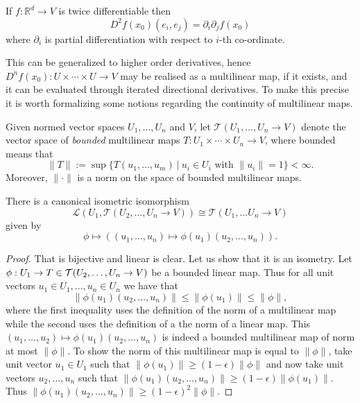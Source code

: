 \documentclass[twoside, a4paper, 10pt]{amsart}
\begin{document}
\begin{lemma}\label{lemma: second derivative is iterated derivative} If $f: \mathbb{R}^d \to V$ is twice differentiable then $$ D^2 f (x_0) (e_i, e_j) = \partial_i \partial_j f(x_0)$$ where $\partial_i$ is partial differentiation with respect to $i$-th co-ordinate. \end{lemma}

This can be generalized to higher order derivatives, hence $D^n f(x_0) : U \times \cdots \times U \to V$ may be realised as a multilinear map, if it exists, and it can be evaluated through iterated directional derivatives. To make this precise it is worth formalizing some notions regarding the continuity of multilinear maps.

\begin{mydef} Given normed vector spaces $U_1, \ldots, U_n$ and $V$, let $\mathcal{T}(U_1, \ldots, U_n \to V)$ denote the vector space of \textit{bounded} multilinear maps $T: U_1 \times \cdots \times U_n \to V$, where bounded means that $$\| T \| := \sup \{ T(u_1, \ldots, u_m) ~|~ u_i \in U_i \text{ with } \|u_i \| = 1 \} < \infty.$$ Moreover, $\| \cdot \|$ is a norm on the space of bounded multilinear maps.  \end{mydef}

\begin{prop} There is a canonical isometric isomorphism $$ \mathcal{L}(U_1, \mathcal{T}(U_2, \ldots, U_n \to V)) \cong \mathcal{T}(U_1, \ldots U_n \to V)$$ given by $$\phi \mapsto ((u_1, \ldots, u_n) \mapsto \phi(u_1)(u_2, \ldots, u_n)).$$  \end{prop}

\begin{proof} That is bijective and linear is clear. Let us show that it is an isometry. Let $\phi:U_1 \to T \in \mathcal{T}(U_2, \ldots, U_n \to V)$ be a bounded linear map. Thus for all unit vectors $u_1 \in U_1, \ldots, u_n \in U_n$ we have that $$\|\phi(u_1)(u_2, \ldots, u_n) \| \leq \|\phi(u_1)\| \leq \|\phi\|,$$ where the first inequality uses the definition of the norm of a multilinear map while the second uses the definition of a the norm of a linear map. This $(u_1, \ldots, u_2) \mapsto \phi(u_1)(u_2, \ldots, u_n)$ is indeed a bounded multilinear map of norm at most $\|\phi \|$. To show the norm of this multilinear map is equal to $\|\phi\|$, take unit vector $u_1 \in U_1$ such that $\|\phi(u_1) \| \geq (1-\epsilon) \|\phi\|$ and now take unit vectors $u_2, \ldots, u_n$ such that $\|\phi(u_1)(u_2, \ldots, u_n)\| \geq (1-\epsilon) \|\phi(u_1)\|$. Thus $\| \phi(u_1)(u_2, \ldots, u_n) \| \geq (1-\epsilon)^2 \|\phi\|$.

\end{proof}
\end{document}
